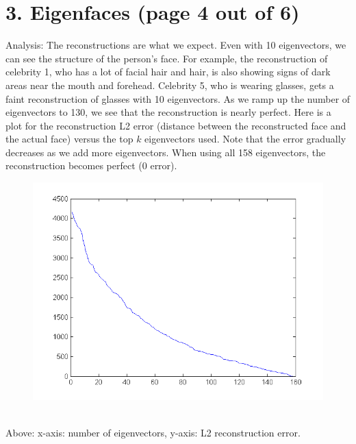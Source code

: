 \documentclass[11pt]{article}
\begin{document}
\section*{3. Eigenfaces (page 4 out of 6)}
Analysis: The reconstructions are what we expect. Even with 10 eigenvectors, we can see the structure of the person's face. For example, the reconstruction of celebrity 1, who has a lot of facial hair and hair, is also showing signs of dark areas near the mouth and forehead. Celebrity 5, who is wearing glasses, gets a faint reconstruction of glasses with 10 eigenvectors. As we ramp up the number of eigenvectors to 130, we see that the reconstruction is nearly perfect. Here is a plot for the reconstruction L2 error (distance between the reconstructed face and the actual face) versus the top $k$ eigenvectors used. Note that the  error gradually decreases as we add more eigenvectors. When using all 158 eigenvectors, the reconstruction becomes perfect (0 error). \\
\begin{figure}[ht!]
\centering
\includegraphics[width=180mm]{images/hw7q2berror.png}
\label{overflow}
\end{figure} \\
Above: x-axis: number of eigenvectors, y-axis: L2 reconstruction error.
\newpage
\end{document}
